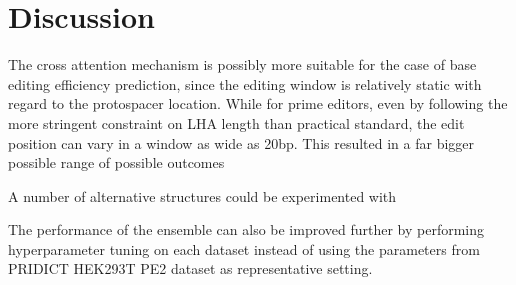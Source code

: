 \chapter{Discussion}

The cross attention mechanism is possibly more suitable for the case of base editing efficiency prediction, since the editing window is relatively static with regard to the protospacer location. While for prime editors, even by following the more stringent constraint on LHA length than practical standard, the edit position can vary in a window as wide as 20bp. This resulted in a far bigger possible range of possible outcomes

A number of alternative structures could be experimented with 

The performance of the ensemble can also be improved further by performing hyperparameter tuning on each dataset instead of using the parameters from PRIDICT HEK293T PE2 dataset as representative setting. 